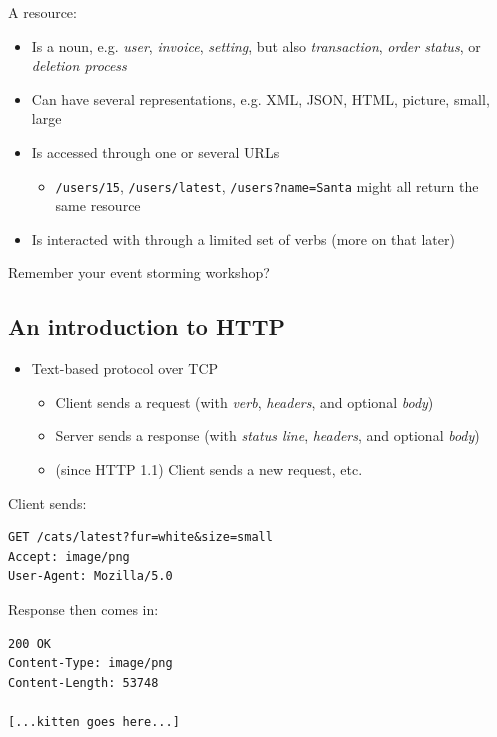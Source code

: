 \documentclass[8pt]{article}
\begin{document}
A resource:
\begin{itemize}
\item Is a noun, e.g. \emph{user}, \emph{invoice}, \emph{setting}, but also \emph{transaction}, \emph{order status}, or \emph{deletion process}
\item Can have several representations, e.g. XML, JSON, HTML, picture, small, large
\item Is accessed through one or several URLs
\begin{itemize}
\item \texttt{/users/15}, \texttt{/users/latest}, \texttt{/users?name=Santa} might all return the same resource
\end{itemize}
\item Is interacted with through a limited set of verbs (more on that later)
\end{itemize}

Remember your event storming workshop?
\subsection{An introduction to HTTP}
\label{sec:org8a214b6}
\begin{itemize}
\item Text-based protocol over TCP
\begin{itemize}
\item Client sends a request (with \emph{verb}, \emph{headers}, and optional \emph{body})
\item Server sends a response (with \emph{status line}, \emph{headers}, and optional \emph{body})
\item (since HTTP 1.1) Client sends a new request, etc.
\end{itemize}
\end{itemize}

Client sends:
\begin{verbatim}
GET /cats/latest?fur=white&size=small
Accept: image/png
User-Agent: Mozilla/5.0

\end{verbatim}

Response then comes in:
\begin{verbatim}
200 OK
Content-Type: image/png
Content-Length: 53748

[...kitten goes here...]
\end{verbatim}
\end{document}
